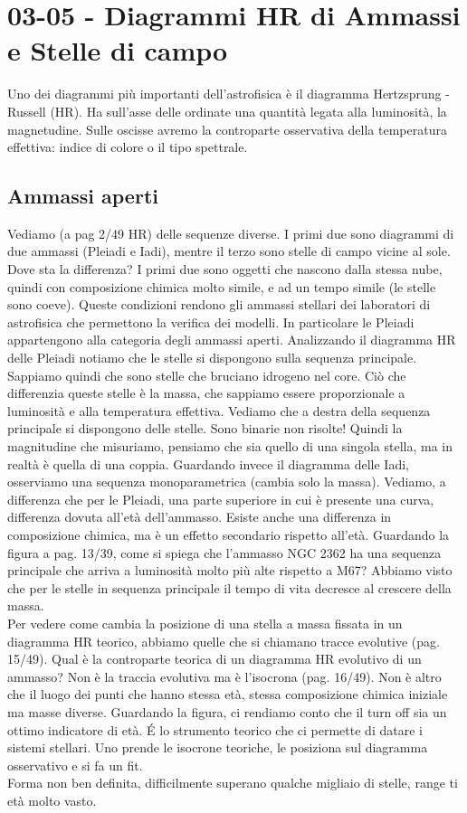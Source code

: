 \section*{03-05 - Diagrammi HR di Ammassi e Stelle di campo}
Uno dei diagrammi più importanti dell'astrofisica è il diagramma Hertzsprung - Russell (HR). Ha sull'asse delle ordinate una quantità legata alla luminosità, la magnetudine. Sulle oscisse avremo la controparte osservativa della temperatura effettiva: indice di colore o il tipo spettrale. 
\subsection*{Ammassi aperti}
Vediamo (a pag 2/49 HR) delle sequenze diverse. I primi due sono diagrammi di due ammassi (Pleiadi e Iadi), mentre il terzo sono stelle di campo vicine al sole. Dove sta la differenza? I primi due sono oggetti che nascono dalla stessa nube, quindi con composizione chimica molto simile, e ad un tempo simile (le stelle sono coeve). Queste condizioni rendono gli ammassi stellari dei laboratori di astrofisica che permettono la verifica dei modelli. In particolare le Pleiadi appartengono alla categoria degli ammassi aperti. Analizzando il diagramma HR delle Pleiadi notiamo che le stelle si dispongono sulla sequenza principale. Sappiamo quindi che sono stelle che bruciano idrogeno nel core. Ciò che differenzia queste stelle è la massa, che sappiamo essere proporzionale a luminosità e alla temperatura effettiva. Vediamo che a destra della sequenza principale si dispongono delle stelle. Sono binarie non risolte! Quindi la magnitudine che misuriamo, pensiamo che sia quello di una singola stella, ma in realtà è quella di una coppia. Guardando invece il diagramma delle Iadi, osserviamo una sequenza monoparametrica (cambia solo la massa). Vediamo, a differenza che per le Pleiadi, una parte superiore in cui è presente una curva, differenza dovuta all'età dell'ammasso. Esiste anche una differenza in composizione chimica, ma è un effetto secondario rispetto all'età. Guardando la figura a pag. 13/39, come si spiega che l'ammasso NGC 2362 ha una sequenza principale che arriva a luminosità molto più alte rispetto a M67? Abbiamo visto che per le stelle in sequenza principale il tempo di vita decresce al crescere della massa. \\
Per vedere come cambia la posizione di una stella a massa fissata in un diagramma HR teorico, abbiamo quelle che si chiamano tracce evolutive (pag. 15/49). Qual è la controparte teorica di un diagramma HR evolutivo di un ammasso? Non è la traccia evolutiva ma è l'isocrona (pag. 16/49). Non è altro che il luogo dei punti che hanno stessa età, stessa composizione chimica iniziale ma masse diverse. Guardando la figura, ci rendiamo conto che il turn off sia un ottimo indicatore di età. \'E lo strumento teorico che ci permette di datare i sistemi stellari. Uno prende le isocrone teoriche, le posiziona sul diagramma osservativo e si fa un fit.\\
Forma non ben definita, difficilmente superano qualche migliaio di stelle, range ti età molto vasto.
